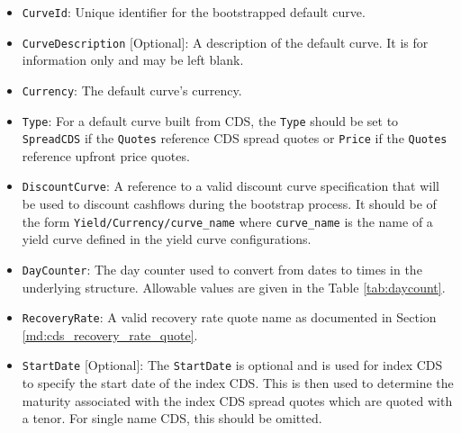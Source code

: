 \begin{itemize}
\item
\lstinline!CurveId!: Unique identifier for the bootstrapped default curve.

\item \lstinline!CurveDescription! [Optional]:
A description of the default curve. It is for information only and may be left blank.

\item \lstinline!Currency!:
The default curve's currency.

\item \lstinline!Type!:
For a default curve built from CDS, the \lstinline!Type! should be set to \lstinline!SpreadCDS! if the \lstinline!Quotes! reference CDS spread quotes or \lstinline!Price! if the \lstinline!Quotes! reference upfront price quotes.

\item \lstinline!DiscountCurve!:
A reference to a valid discount curve specification that will be used to discount cashflows during the bootstrap process. It should be of the form \lstinline!Yield/Currency/curve_name! where \lstinline!curve_name! is the name of a yield curve defined in the yield curve configurations.

\item \lstinline!DayCounter!:
The day counter used to convert from dates to times in the underlying structure. Allowable values are given in the Table \ref{tab:daycount}.

\item \lstinline!RecoveryRate!:
A valid recovery rate quote name as documented in Section \ref{md:cds_recovery_rate_quote}.

\item \lstinline!StartDate! [Optional]:
The \lstinline!StartDate! is optional and is used for index CDS to specify the start date of the index CDS. This is then used to determine the maturity associated with the index CDS spread quotes which are quoted with a tenor. For single name CDS, this should be omitted.


\end{itemize}
